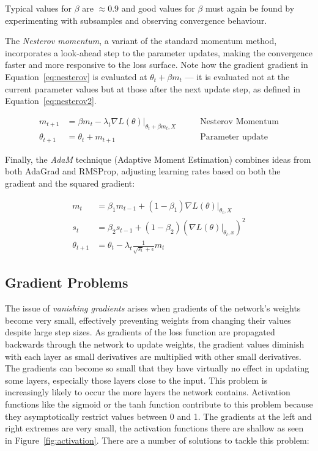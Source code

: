 Typical values for $\beta$ are $\approx 0.9$ and good values for $\beta$ must again be found by experimenting with subsamples and observing convergence behaviour. 

The \emph{Nesterov momentum}, a variant of the standard momentum method, incorporates a look-ahead step to the parameter updates, making the convergence faster and more responsive to the loss surface. Note how the gradient gradient in Equation~\ref{eq:nesterov} is evaluated at $\theta_t + \beta m_t$ --- it is evaluated not at the current parameter values but at those after the next update step, as defined in Equation~\ref{eq:nesterov2}. 

\begin{align}
m_{t+1} &= \beta m_{t} - \lambda_t \nabla L(\theta) \rvert_{\theta_{t}+\beta m_{t}, X} &\qquad \text{Nesterov Momentum} \label{eq:nesterov} \\
\theta_{t+1} &= \theta_{t} + m_{t+1} &\qquad \text{Parameter update} \label{eq:nesterov2}
\end{align}

Finally, the \emph{AdaM} technique (Adaptive Moment Estimation) combines ideas from both AdaGrad and RMSProp, adjusting learning rates based on both the gradient and the squared gradient:

\begin{align}
m_t &= \beta_1 m_{t-1} + (1-\beta_1) \nabla L(\theta)\rvert_{\theta_t, X}  \label{eq:adam1} \\ 
s_t &= \beta_2 s_{t-1} + (1-\beta_2) \left( \nabla L(\theta)\vert_{\theta_t, x} \right)^2 \label{eq:adam2} \\
\theta_{t+1} &= \theta_t - \lambda_t \frac{1}{\sqrt{s_t}+\epsilon} m_t \label{eq:adam3} 
\end{align}

\FloatBarrier
\subsection{Gradient Problems}

The issue of \emph{vanishing gradients} arises when gradients of the network's weights become very small, effectively preventing weights from changing their values despite large step sizes. As gradients of the loss function are propagated backwards through the network to update weights, the gradient values diminish with each layer as small derivatives are multiplied with  other small derivatives. The gradients can become so small that they have virtually no effect in updating some layers, especially those layers close to the input. This problem is increasingly likely to occur the more layers the network contains. Activation functions like the sigmoid or the tanh function contribute to this problem because they asymptotically restrict values between 0 and 1. The gradients at the left and right extremes are very small, the activation functions there are shallow as seen in Figure~\ref{fig:activation}. There are a number of solutions to tackle this problem:

